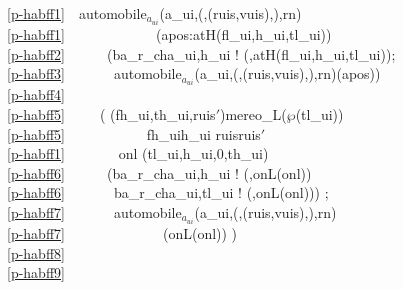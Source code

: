 {\mnewfoil
\bp
\ref{p-habff1}\ \ automobile$_{a_{ui}}$(a\_ui,({\LBRACE}{\RBRACE},(ruis,vuis),{\LBRACE}{\RBRACE}),rn)\\
\ref{p-habff1}\ \ \ \ \ \ \ \ \ \ \ \ \ (apos:atH(fl\_ui,h\_ui,tl\_ui)) {\IS}\\
\ref{p-habff2}\ \ \ \ \ \ (ba\_r\_ch{\LBRACKET}a\_ui,h\_ui{\RBRACKET} ! (\recordtime,atH(fl\_ui,h\_ui,tl\_ui));\\
\ref{p-habff3}\ \ \ \ \ \ \ automobile$_{a_{ui}}$(a\_ui,({\LBRACE}{\RBRACE},(ruis,vuis),{\LBRACE}{\RBRACE}),rn)(apos))\\
\ref{p-habff4}\ \ \ \ \ {\NONDETCHOICE}\\
\ref{p-habff5}\ \ \ \ \ ( ({\LBRACE}fh\_ui,th\_ui{\RBRACE},ruis$'$){\EQ}mereo\_L($\wp$(tl\_ui)) \\
\ref{p-habff5}\ \ \ \ \ \ \ \ \ \ \  fh\_ui{\EQ}h\_ui {\WEDGE} ruis{\EQ}ruis$'$\\
\ref{p-habff1}\ \ \ \ \ \ \  onl {\EQ} (tl\_ui,h\_ui,0,th\_ui) \\
\ref{p-habff6}\ \ \ \ \ \ (ba\_r\_ch{\LBRACKET}a\_ui,h\_ui{\RBRACKET} ! (\recordtime,onL(onl)) {\PARL}\\
\ref{p-habff6}\ \ \ \ \ \ \ ba\_r\_ch{\LBRACKET}a\_ui,tl\_ui{\RBRACKET} ! (\recordtime,onL(onl))) ;\\
\ref{p-habff7}\ \ \ \ \ \ \ automobile$_{a_{ui}}$(a\_ui,({\LBRACE}{\RBRACE},(ruis,vuis),{\LBRACE}{\RBRACE}),rn)\\
\ref{p-habff7}\ \ \ \ \ \ \ \ \ \ \ \ \ \ (onL(onl))  )\\
\ref{p-habff8}\ \ \ \ \ {\NONDETCHOICE}\\
\ref{p-habff9}\ \ \ \ \ \ \ \ 
\ep
}\rm\HHHH


